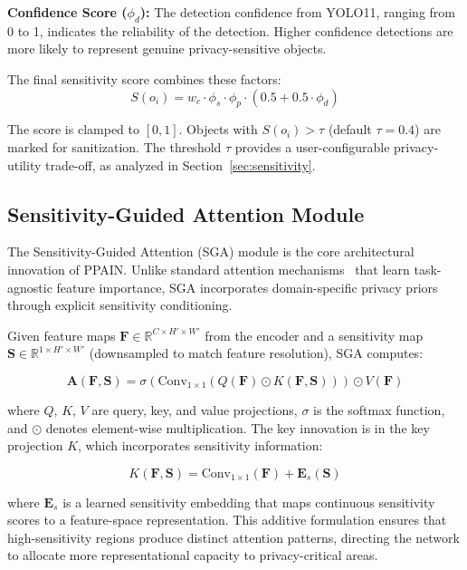 \documentclass[preprint,12pt]{elsarticle}
\begin{document}
\textbf{Confidence Score ($\phi_d$):} The detection confidence from YOLO11, ranging from 0 to 1, indicates the reliability of the detection. Higher confidence detections are more likely to represent genuine privacy-sensitive objects.

The final sensitivity score combines these factors:
\begin{equation}
S(o_i) = w_c \cdot \phi_s \cdot \phi_p \cdot (0.5 + 0.5 \cdot \phi_d)
\label{eq:sensitivity}
\end{equation}

The score is clamped to $[0, 1]$. Objects with $S(o_i) > \tau$ (default $\tau = 0.4$) are marked for sanitization. The threshold $\tau$ provides a user-configurable privacy-utility trade-off, as analyzed in Section~\ref{sec:sensitivity}.

\subsection{Sensitivity-Guided Attention Module}

The Sensitivity-Guided Attention (SGA) module is the core architectural innovation of PPAIN. Unlike standard attention mechanisms~\cite{woo2018cbam,hu2018squeeze} that learn task-agnostic feature importance, SGA incorporates domain-specific privacy priors through explicit sensitivity conditioning.

Given feature maps $\mathbf{F} \in \mathbb{R}^{C \times H' \times W'}$ from the encoder and a sensitivity map $\mathbf{S} \in \mathbb{R}^{1 \times H' \times W'}$ (downsampled to match feature resolution), SGA computes:

\begin{equation}
\mathbf{A}(\mathbf{F}, \mathbf{S}) = \sigma\left(\text{Conv}_{1\times1}\left(Q(\mathbf{F}) \odot K(\mathbf{F}, \mathbf{S})\right)\right) \odot V(\mathbf{F})
\label{eq:sga}
\end{equation}

where $Q$, $K$, $V$ are query, key, and value projections, $\sigma$ is the softmax function, and $\odot$ denotes element-wise multiplication. The key innovation is in the key projection $K$, which incorporates sensitivity information:

\begin{equation}
K(\mathbf{F}, \mathbf{S}) = \text{Conv}_{1\times1}(\mathbf{F}) + \mathbf{E}_s(\mathbf{S})
\label{eq:key}
\end{equation}

where $\mathbf{E}_s$ is a learned sensitivity embedding that maps continuous sensitivity scores to a feature-space representation. This additive formulation ensures that high-sensitivity regions produce distinct attention patterns, directing the network to allocate more representational capacity to privacy-critical areas.
\end{document}

